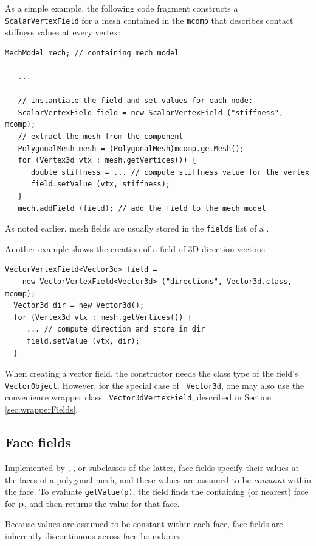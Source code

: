 As a simple example, the following code fragment constructs a {\tt
ScalarVertexField} for a mesh contained in the 
 {\tt mcomp}
that describes contact stiffness values 
at every vertex:
%
\begin{lstlisting}[]
   MechModel mech; // containing mech model
   
   ...

   // instantiate the field and set values for each node:
   ScalarVertexField field = new ScalarVertexField ("stiffness", mcomp);
   // extract the mesh from the component
   PolygonalMesh mesh = (PolygonalMesh)mcomp.getMesh();
   for (Vertex3d vtx : mesh.getVertices()) {
      double stiffness = ... // compute stiffness value for the vertex
      field.setValue (vtx, stiffness);
   }
   mech.addField (field); // add the field to the mech model
\end{lstlisting}
%
As noted earlier, mesh fields are usually stored in the {\tt fields}
list of a .

Another example shows the creation of a field of 3D direction vectors:
%
\begin{lstlisting}[]
  VectorVertexField<Vector3d> field =
    new VectorVertexField<Vector3d> ("directions", Vector3d.class, mcomp);
  Vector3d dir = new Vector3d();
  for (Vertex3d vtx : mesh.getVertices()) {
     ... // compute direction and store in dir
     field.setValue (vtx, dir);
  }
\end{lstlisting}
%
When creating a vector field, the constructor needs the class type of
the field's {\tt VectorObject}. However, for the special case of {\tt
Vector3d}, one may also use the convenience wrapper class {\tt
Vector3dVertexField}, described in Section \ref{sec:wrapperFields}.

\subsection{Face fields}

Implemented by
,
, 
or subclasses of the latter, face fields specify their values at the
faces of a polygonal mesh, and these values are assumed to be {\it
constant} within the face. To evaluate {\tt getValue(p)}, the field
finds the containing (or nearest) face for ${\bf p}$, and then returns the
value for that face.

\begin{sideblock}
Because values are assumed to be constant within each face, face fields
are inherently discontinuous across face boundaries.
\end{sideblock}

